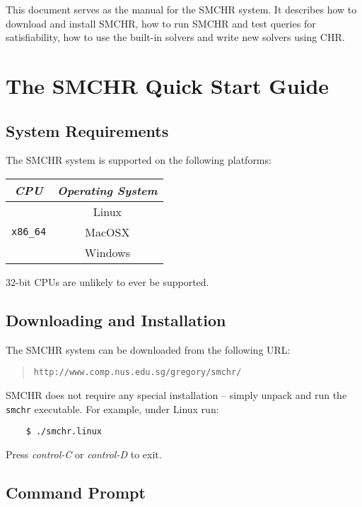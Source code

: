 \documentclass{article}
\begin{document}
This document serves as the manual for the SMCHR system.
It describes how to download and install SMCHR, how to run SMCHR and
test queries for satisfiability, how to use the built-in solvers and
write new solvers using CHR.

\section{The SMCHR Quick Start Guide}

\subsection{System Requirements}

The SMCHR system is supported on the following platforms:
\begin{center}
\begin{tabular}{|c|c|}
\hline
\emph{CPU} & \emph{Operating System} \\
\hline
\hline
& Linux \\
\texttt{x86\_64} & MacOSX \\
& Windows \\
\hline
\end{tabular}
\end{center}
32-bit CPUs are unlikely to ever be supported.

\subsection{Downloading and Installation}

The SMCHR system can be downloaded from the following URL:
\begin{quote}
    \texttt{http://www.comp.nus.edu.sg/gregory/smchr/}
\end{quote}
SMCHR does not require any special installation -- simply unpack and run the
\texttt{smchr} executable.
For example, under Linux run:
\begin{verbatim}
    $ ./smchr.linux
\end{verbatim}
Press \emph{control-C} or \emph{control-D} to exit.

\subsection{Command Prompt}
\end{document}
